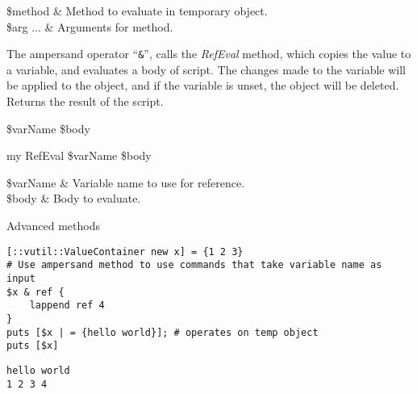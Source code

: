 \documentclass{article}
\begin{document}
\begin{args}
\$method & Method to evaluate in temporary object. \\
\$arg ... & Arguments for method.
\end{args}

The ampersand operator ``\texttt{\&}'', calls the \textit{RefEval} method, which copies the value to a variable, and evaluates a body of script. 
The changes made to the variable will be applied to the object, and if the variable is unset, the object will be deleted.
Returns the result of the script.

\begin{syntax}
 \$varName \$body
\end{syntax}
\begin{syntax}
my RefEval \$varName \$body
\end{syntax}
\begin{args}
\$varName & Variable name to use for reference. \\
\$body & Body to evaluate.
\end{args}
\begin{example}{Advanced methods}
\begin{lstlisting}
[::vutil::ValueContainer new x] = {1 2 3}
# Use ampersand method to use commands that take variable name as input
$x & ref {
    lappend ref 4
}
puts [$x | = {hello world}]; # operates on temp object
puts [$x]
\end{lstlisting}
\tcblower
\begin{lstlisting}
hello world
1 2 3 4
\end{lstlisting}
\end{example}
\end{document}
